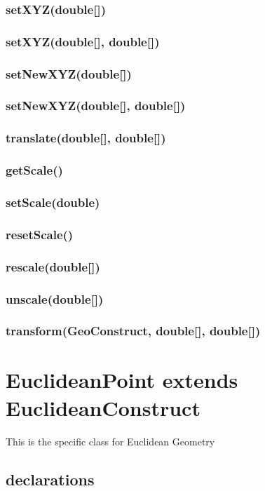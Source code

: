 \documentclass[a4paper,10pt]{report}
\begin{document}
\subsubsection{setXYZ(double[])}
\subsubsection{setXYZ(double[], double[])}
\subsubsection{setNewXYZ(double[])}
\subsubsection{setNewXYZ(double[], double[])}
\subsubsection{translate(double[], double[])}
\subsubsection{getScale()}
\subsubsection{setScale(double)}
\subsubsection{resetScale()}
\subsubsection{rescale(double[])}
\subsubsection{unscale(double[])}
\subsubsection{transform(GeoConstruct, double[], double[])}
\section{EuclideanPoint extends EuclideanConstruct} This is the specific class for Euclidean Geometry
\subsection{declarations}
\end{document}
